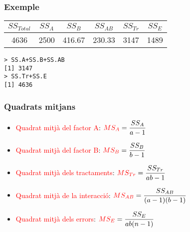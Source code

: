 \documentclass[12pt,t]{beamer}
\newcommand{\red}[1]{\textcolor{red}{#1}}
\theoremstyle{plain}
\theoremstyle{definition}
\begin{document}
\begin{frame}[fragile]
\frametitle{Exemple}

\begin{center}
\begin{tabular}{cccccc}
$SS_{Total}$ & $SS_A$ & $SS_B$ &   $SS_{AB}$ &$SS_{Tr}$ &  $SS_E$\\ \hline
4636 & 2500  & 416.67  &   230.33  & 3147  &  1489
\end{tabular}
\end{center}

\begin{lstlisting}
> SS.A+SS.B+SS.AB
[1] 3147
> SS.Tr+SS.E
[1] 4636
\end{lstlisting}


\end{frame}


\begin{frame}
\frametitle{Quadrats mitjans}

\begin{itemize}
\item  \red{Quadrat mitjà del factor A}: 
$\red{MS_A} =\dfrac{SS_A}{a-1}$\bigskip

\item  \red{Quadrat mitjà del factor B}: 
$\red{MS_B} =\dfrac{SS_B}{b-1}$\bigskip


\item  \red{Quadrat mitjà dels tractaments}: 
$\red{MS_{Tr}}=\dfrac{SS_{Tr}}{ab-1}$\bigskip


\item  \red{Quadrat mitjà de la interacció}: 
$\red{MS_{AB}}=\dfrac{SS_{AB}}{(a-1)(b-1)}$\bigskip


\item  \red{Quadrat mitjà dels errors}: 
$\red{MS_E}=\dfrac{SS_E}{ab (n-1)}$

\end{itemize}
\end{frame}
\end{document}
